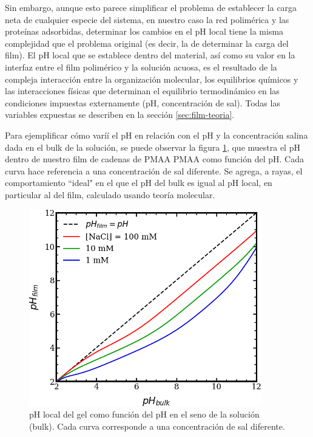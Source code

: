 Sin embargo, aunque esto parece simplificar el problema de establecer la carga neta de cualquier especie del sistema, en nuestro caso la red polim\'erica y las prote\'inas adsorbidas, determinar los cambios en el pH local tiene la misma complejidad que el problema original (es decir, la de determinar la carga del film). El pH local que se establece dentro del material, as\'i como su valor en la interfaz entre el film polim\'erico y la soluci\'on acuosa, es el resultado de la compleja interacci\'on entre la organizaci\'on molecular, los equilibrios qu\'imicos y las interacciones f\'isicas que determinan el equilibrio termodin\'amico en las condiciones impuestas externamente (pH, concentraci\'on de sal). Todas las variables expuestas se describen en la secci\'on \ref{sec:film-teoria}.

Para ejemplificar c\'omo varí\'i el pH en relaci\'on con el pH y la concentraci\'on salina dada en el bulk de la soluci\'on, se puede observar la figura \ref{fig:film:pH-local}, que muestra el pH dentro de nuestro film de cadenas de 
PMAA
PMAA como funci\'on del pH. Cada curva hace referencia a una concentraci\'on de sal diferente. Se agrega, a rayas, el comportamiento ``ideal" en el que el pH del bulk es igual al pH local, en particular al del film, calculado usando teor\'ia molecular.


\begin{figure}
    \centering
    \includegraphics[width=0.9\textwidth]{Figures/graph-film/pH-local.png}
    \caption{pH local del gel como funci\'on del pH en el seno de la soluci\'on (bulk). Cada curva corresponde a una concentraci\'on de sal diferente.}
    \label{fig:film:pH-local}
\end{figure}

